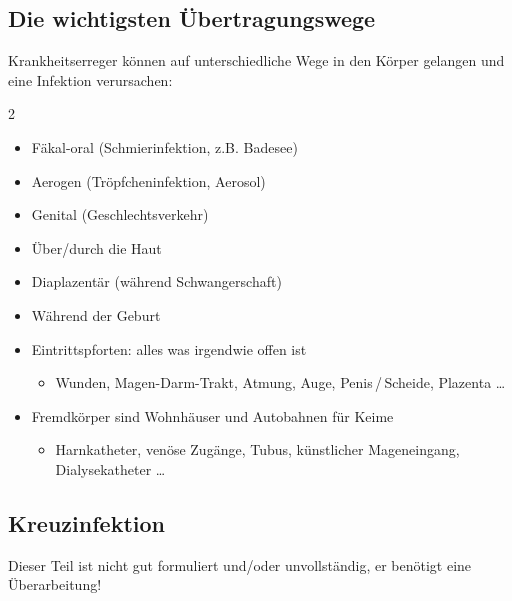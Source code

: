 \subsection{Die wichtigsten Übertragungswege}
\label{topic:infektion-uebertragungswege}


Krankheitserreger können auf unterschiedliche Wege in den
Körper gelangen und eine Infektion verursachen:

\begin{multicols}{2}
  \begin{itemize}
    \item Fäkal-oral (Schmierinfektion, z.B. Badesee)
    \item Aerogen (Tröpfcheninfektion, Aerosol)
    \item Genital (Geschlechtsverkehr)
    \item Über/durch die Haut
    \item Diaplazentär (während Schwangerschaft)
    \item Während der Geburt
    \item Eintrittspforten: alles was irgendwie offen ist
    \begin{itemize}
      \item Wunden, Magen-Darm-Trakt, Atmung, Auge, Penis\,/\,Scheide,
      Plazenta
      \ldots
    \end{itemize}
    \item Fremdkörper sind Wohnhäuser und Autobahnen für Keime
    \begin{itemize}
      \item Harnkatheter, venöse Zugänge, Tubus, künstlicher
      Mageneingang, Dialysekatheter {\dots}
    \end{itemize}
  \end{itemize}
\end{multicols}




\subsection{Kreuzinfektion}
\label{topic:kreuzinfektion}
{Dieser Teil ist nicht gut formuliert und/oder unvollständig, 
er benötigt eine Überarbeitung!}


